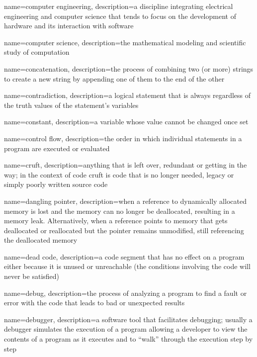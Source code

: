 {
  name=computer engineering,
  description={a discipline integrating electrical engineering and computer science that tends to focus on the development of hardware and its interaction with software}
}

{
  name=computer science,
  description={the mathematical modeling and scientific study of computation}
}

{
  name=concatenation,
  description={the process of combining two (or more) strings to create a new string by appending one of them to the end of the other}
}

{
  name=contradiction,
  description={a logical statement that is always \False regardless of the truth values of the statement's variables}
}

{
  name=constant,
  description={a variable whose value cannot be changed once set}
}

{
  name=control flow,
  description={the order in which individual statements in a program are executed or evaluated}
}

{
  name=cruft,
  description={anything that is left over, redundant or getting in the way; in the context of code cruft is code that is no longer needed, legacy or simply poorly written source code}
}

{
  name=dangling pointer,
  description={when a reference to dynamically allocated memory is lost and the memory can no longer be deallocated, resulting in a memory leak.  Alternatively, when a reference points to memory that gets deallocated or reallocated but the pointer remains unmodified, still referencing the deallocated memory}
}

{
  name=dead code,
  description={a code segment that has no effect on a program either because it is unused or unreachable (the 
	conditions involving the code will never be satisfied)}
}

{
  name=debug,
  description={the process of analyzing a program to find a fault or error with the code that leads to bad or unexpected results}
}

{
  name=debugger,
  description={a software tool that facilitates debugging; usually a debugger simulates the execution of a program allowing a developer to view the contents of a program as it executes and to ``walk'' through the execution step by step}
}

